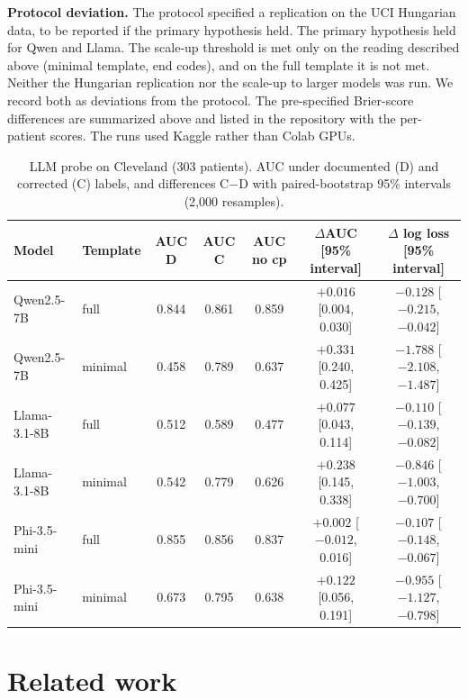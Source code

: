 \documentclass[11pt]{article}
\begin{document}
\textbf{Protocol deviation.} The protocol specified a replication on the UCI Hungarian data, to be reported if the primary hypothesis held. The primary hypothesis held for Qwen and Llama. The scale-up threshold is met only on the reading described above (minimal template, end codes), and on the full template it is not met. Neither the Hungarian replication nor the scale-up to larger models was run. We record both as deviations from the protocol. The pre-specified Brier-score differences are summarized above and listed in the repository with the per-patient scores. The runs used Kaggle rather than Colab GPUs.

\begin{table}[t]
\centering
\footnotesize
\setlength{\tabcolsep}{4pt}
\caption{LLM probe on Cleveland (303 patients). AUC under documented (D) and corrected (C) labels, and differences C$-$D with paired-bootstrap 95\% intervals (2{,}000 resamples).}\label{tab:llm}
\begin{tabular}{llccccc}
\toprule
Model & Template & AUC D & AUC C & AUC no cp & $\Delta$AUC [95\% interval] & $\Delta$ log loss [95\% interval]\\
\midrule
Qwen2.5-7B & full & 0.844 & 0.861 & 0.859 & $+0.016$ [0.004, 0.030] & $-0.128$ [$-0.215$, $-0.042$]\\
Qwen2.5-7B & minimal & 0.458 & 0.789 & 0.637 & $+0.331$ [0.240, 0.425] & $-1.788$ [$-2.108$, $-1.487$]\\
Llama-3.1-8B & full & 0.512 & 0.589 & 0.477 & $+0.077$ [0.043, 0.114] & $-0.110$ [$-0.139$, $-0.082$]\\
Llama-3.1-8B & minimal & 0.542 & 0.779 & 0.626 & $+0.238$ [0.145, 0.338] & $-0.846$ [$-1.003$, $-0.700$]\\
Phi-3.5-mini & full & 0.855 & 0.856 & 0.837 & $+0.002$ [$-0.012$, 0.016] & $-0.107$ [$-0.148$, $-0.067$]\\
Phi-3.5-mini & minimal & 0.673 & 0.795 & 0.638 & $+0.122$ [0.056, 0.191] & $-0.955$ [$-1.127$, $-0.798$]\\
\bottomrule
\end{tabular}
\end{table}

\section{Related work}
\end{document}
